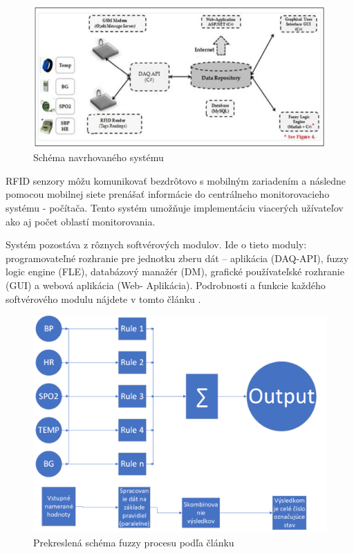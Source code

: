 \begin{figure}[H]
\centering
\includegraphics[scale=0.75]{scheme-fuzzy.png}
\caption{Schéma navrhovaného systému \cite{2019}}
\label{schema}
\end{figure}

RFID senzory môžu komunikovať bezdrôtovo s mobilným zariadením a následne pomocou mobilnej siete prenášať informácie do centrálneho monitorovacieho systému - počítača. Tento systém umožňuje implementáciu viacerých užívateľov ako aj počet oblastí monitorovania. \cite{2019} 

Systém pozostáva z rôznych softvérových modulov. Ide o tieto moduly: programovateľné rozhranie pre jednotku zberu dát – aplikácia (DAQ-API), fuzzy logic engine (FLE), databázový manažér (DM), grafické používateľské rozhranie (GUI) a webová aplikácia (Web- Aplikácia).\cite{2019} Podrobnosti a funkcie každého softvérového modulu nájdete v tomto článku \cite{2019}. 

\begin{figure}[H]
\centering
\includegraphics[scale=0.5]{rule-based-engine.png}
\caption{Prekreslená schéma fuzzy procesu podľa článku\cite{2019}}
\label{fuzzy}
\end{figure}

